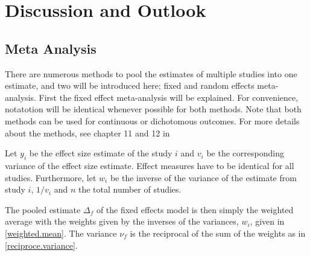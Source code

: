 \documentclass[11pt,a4paper,twoside]{book}\usepackage[]{graphicx}\usepackage[]{color}
\begin{document}
% 
% 






\chapter{Discussion and Outlook}

\section{Meta Analysis}
There are numerous methods to pool the estimates of multiple studies into one estimate, and two will be introduced here; fixed and random effects meta-analysis.
First the fixed effect meta-analysis will be explained. For convenience, notatotion will be identical whenever possible for both methods. Note that both methods can be used for continuous or dichotomous outcomes. For more details about the methods, see chapter 11 and 12 in \citet{metaanalysis}


\vspace{0mm}
Let $y_{i}$ be the effect size estimate of the study $i$ and $v_{i}$ be the corresponding variance of the effect size estimate. Effect measures have to be identical for all studies. Furthermore, let $w_i$ be the inverse of the variance of the estimate from study $i$, $1/v_{i}$ and $n$ the total number of studies.

\vspace{0mm}
The pooled estimate $\Delta_{f}$ of the fixed effects model is then simply the weighted average with the weights given by the inverses of the variances, $w_{i}$, given in \ref{weighted.mean}. The variance $\nu_{f}$ is the reciprocal of the sum of the weights as in \ref{reciproce.variance}.
\end{document}
